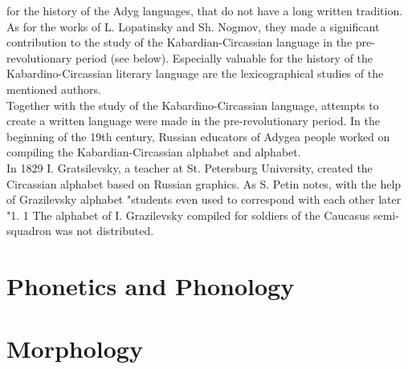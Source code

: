 \documentclass[a4paper,12pt]{book}
\newcommand{\1}[1]{\textbf{\emph{#1}}} %
\newcommand{\2}[1]{\textbf{[#1]}} %
\newcommand{\3}[1]{\fontsize{11pt}{0cm}\textbf{\emph{#1}}} %
\newcommand{\4}[1]{\fontsize{10pt}{0cm}\emph{#1}}	%
\newcommand{\5}[1]{\textbf{/#1/}} %
\newcommand{\6}[1]{\textbf{[#1]}} %
\newcommand{\7}[1]{\fontsize{12pt}{0cm}\emph{#1}} %
\newcommand{\8}[1]{\fontsize{12pt}{0cm}`#1'} %
\newcommand{\9}[1]{\fontsize{12pt}{0cm}(lit. `#1')} %
\begin{document}
for the history of the Adyg languages, that do not have a long written tradition.\\
As for the works of L. Lopatinsky and Sh. Nogmov, they made a significant contribution to the study of the Kabardian-Circassian language in the pre-revolutionary period (see below). Especially valuable for the history of the Kabardino-Circassian literary language are the lexicographical studies of the mentioned authors.\\
Together with the study of the Kabardino-Circassian language, attempts to create a written language were made in the pre-revolutionary period. In the beginning of the 19th century, Russian educators of Adygea people worked on compiling the Kabardian-Circassian alphabet and alphabet.\\
In 1829 I. Gratsilevsky, a teacher at St. Petersburg University, created the Circassian alphabet based on Russian graphics. As S. Petin notes, with the help of Grazilevsky alphabet "students even used to correspond with each other later "1. 1 The alphabet of I. Grazilevsky compiled for soldiers of the Caucasus semi-squadron was not distributed.\\

\chapter{Phonetics and Phonology}
\chapter{Morphology}
\end{document}

